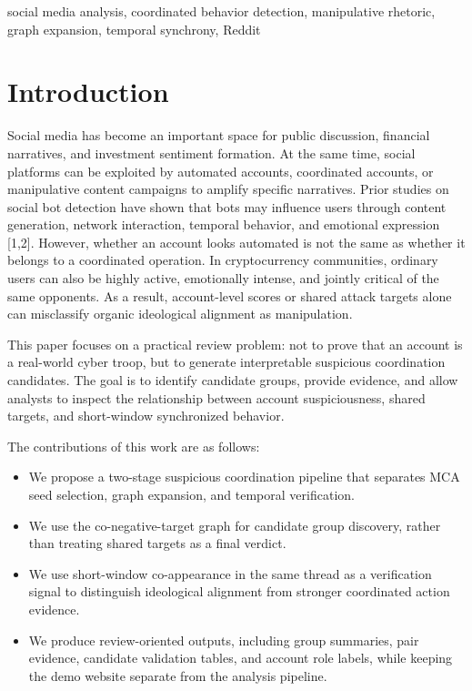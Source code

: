 \documentclass[conference]{IEEEtran}
\begin{document}
\begin{IEEEkeywords}
social media analysis, coordinated behavior detection, manipulative rhetoric, graph expansion, temporal synchrony, Reddit
\end{IEEEkeywords}

\section{Introduction}

Social media has become an important space for public discussion, financial narratives, and investment sentiment formation. At the same time, social platforms can be exploited by automated accounts, coordinated accounts, or manipulative content campaigns to amplify specific narratives. Prior studies on social bot detection have shown that bots may influence users through content generation, network interaction, temporal behavior, and emotional expression [1,2]. However, whether an account looks automated is not the same as whether it belongs to a coordinated operation. In cryptocurrency communities, ordinary users can also be highly active, emotionally intense, and jointly critical of the same opponents. As a result, account-level scores or shared attack targets alone can misclassify organic ideological alignment as manipulation.

This paper focuses on a practical review problem: not to prove that an account is a real-world cyber troop, but to generate interpretable suspicious coordination candidates. The goal is to identify candidate groups, provide evidence, and allow analysts to inspect the relationship between account suspiciousness, shared targets, and short-window synchronized behavior.

The contributions of this work are as follows:

\begin{itemize}
  \item We propose a two-stage suspicious coordination pipeline that separates MCA seed selection, graph expansion, and temporal verification.
  \item We use the co-negative-target graph for candidate group discovery, rather than treating shared targets as a final verdict.
  \item We use short-window co-appearance in the same thread as a verification signal to distinguish ideological alignment from stronger coordinated action evidence.
  \item We produce review-oriented outputs, including group summaries, pair evidence, candidate validation tables, and account role labels, while keeping the demo website separate from the analysis pipeline.
\end{itemize}
\end{document}
